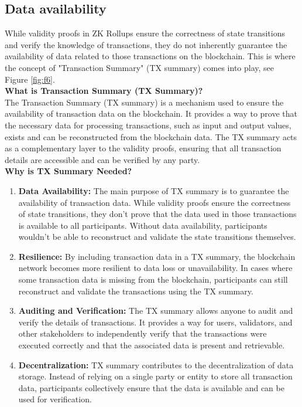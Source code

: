 \documentclass{report}
\begin{document}
\subsection{Data availability}
While validity proofs in ZK Rollups ensure the correctness of state transitions and verify the knowledge of transactions, they do not inherently guarantee the availability of data related to those transactions on the blockchain. This is where the concept of "Transaction Summary" (TX summary) comes into play, see Figure \ref{fig:f6}.\\
\textbf{What is Transaction Summary (TX Summary)?}\\
The Transaction Summary (TX summary) is a mechanism used to ensure the availability of transaction data on the blockchain. It provides a way to prove that the necessary data for processing transactions, such as input and output values, exists and can be reconstructed from the blockchain data. The TX summary acts as a complementary layer to the validity proofs, ensuring that all transaction details are accessible and can be verified by any party.\\
\textbf{Why is TX Summary Needed?}
\begin{enumerate}
	\item \textbf{Data Availability:}  The main purpose of TX summary is to guarantee the availability of transaction data. While validity proofs ensure the correctness of state transitions, they don't prove that the data used in those transactions is available to all participants. Without data availability, participants wouldn't be able to reconstruct and validate the state transitions themselves.
	\item \textbf{Resilience:} By including transaction data in a TX summary, the blockchain network becomes more resilient to data loss or unavailability. In cases where some transaction data is missing from the blockchain, participants can still reconstruct and validate the transactions using the TX summary.
	\item \textbf{Auditing and Verification:} The TX summary allows anyone to audit and verify the details of transactions. It provides a way for users, validators, and other stakeholders to independently verify that the transactions were executed correctly and that the associated data is present and retrievable.
	\item \textbf{Decentralization:} TX summary contributes to the decentralization of data storage. Instead of relying on a single party or entity to store all transaction data, participants collectively ensure that the data is available and can be used for verification.
\end{enumerate}
\end{document}

